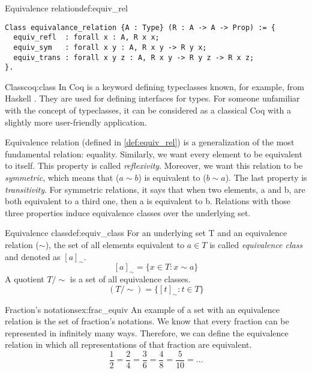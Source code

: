 \begin{defi}{Equivalence relation}{def:equiv_rel}
\begin{verbatim}
Class equivalance_relation {A : Type} (R : A -> A -> Prop) := {
  equiv_refl  : forall x : A, R x x;
  equiv_sym   : forall x y : A, R x y -> R y x;
  equiv_trans : forall x y z : A, R x y -> R y z -> R x z;
}.
\end{verbatim}
\end{defi}
\begin{coq}{Class}{coq:class}
In Coq  is a keyword defining typeclasses known, for example, from Haskell \cite{Haskell}. They are used for defining interfaces for types. For someone unfamiliar with the concept of typeclasses, it can be considered as a classical Coq  with a slightly more user-friendly application.
\end{coq}

Equivalence relation (defined in \ref{def:equiv_rel}) is a generalization of the most fundamental relation: equality. Similarly, we want every element to be equivalent to itself. This property is called \emph{reflexivity}. Moreover, we want this relation to be \emph{symmetric}, which means that ($a \sim b$) is equivalent to ($b \sim a$). The last property is \emph{transitivity}. For symmetric relations, it says that when two elements, a and b, are both equivalent to a third one, then a is equivalent to b. Relations with those three properties induce equivalence classes \cite{AbstractAlgebra} over the underlying set.

\begin{defi}{Equivalence class}{def:equiv_class}
For an underlying set T and an equivalence relation ($\sim$), the set of all elements equivalent to $a \in T$ is called \emph{equivalence class} and denoted as $[a]_\sim$.
$$ [a]_\sim = \{x \in T : x \sim a \}$$
A quotient $T / \sim$ is a set of all equivalence classes. 
$$ (T / \sim) = \{[t]_\sim : t \in T\}$$
\end{defi}

\begin{example}{Fraction's notations}{ex:frac_equiv}
An example of a set with an equivalence relation is the set of fraction's notations. We know that every fraction can be represented in infinitely many ways. Therefore, we can define the equivalence relation in which all representations of that fraction are equivalent.
$$ \frac{1}{2} = \frac{2}{4} = \frac{3}{6} = \frac{4}{8} = \frac{5}{10} = \dots$$
\end{example}

